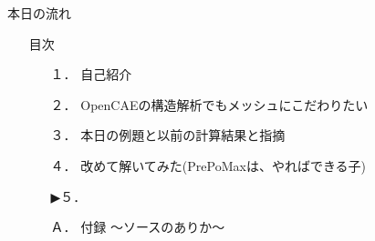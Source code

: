 \begin{frame}{本日の流れ}
  \begin{itemize}
      \item[] 目次
      \begin{itemize}[itemsep=1.3ex, leftmargin=1cm]
        \item[１．] 自己紹介
        \item[２．] OpenCAEの構造解析でもメッシュにこだわりたい
        \item[３．] 本日の例題と以前の計算結果と指摘
        \item[４．] 改めて解いてみた(PrePoMaxは、やればできる子) 
        \item[▶５．] 
        \item[Ａ．] 付録 ～ソースのありか～
      \end{itemize}
  \end{itemize}
\end{frame}
